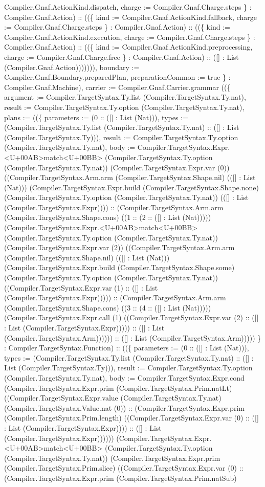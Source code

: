 \documentclass[11pt]{article}
\begin{document}
Compiler.Gnaf.ActionKind.dispatch, charge := Compiler.Gnaf.Charge.steps \} : Compiler.Gnaf.Action) :: ((\{ kind := Compiler.Gnaf.ActionKind.fallback, charge := Compiler.Gnaf.Charge.steps \} : Compiler.Gnaf.Action) :: ((\{ kind := Compiler.Gnaf.ActionKind.execution, charge := Compiler.Gnaf.Charge.steps \} : Compiler.Gnaf.Action) :: ((\{ kind := Compiler.Gnaf.ActionKind.preprocessing, charge := Compiler.Gnaf.Charge.free \} : Compiler.Gnaf.Action) :: ([] : List (Compiler.Gnaf.Action))))))), boundary := Compiler.Gnaf.Boundary.preparedPlan, preparationCommon := true \} : Compiler.Gnaf.Machine), carrier := Compiler.Gnaf.Carrier.grammar ((\{ argument := Compiler.TargetSyntax.Ty.list (Compiler.TargetSyntax.Ty.nat), result := Compiler.TargetSyntax.Ty.option (Compiler.TargetSyntax.Ty.nat), plans := ((\{ parameters := (0 :: ([] : List (Nat))), types := (Compiler.TargetSyntax.Ty.list (Compiler.TargetSyntax.Ty.nat) :: ([] : List (Compiler.TargetSyntax.Ty))), result := Compiler.TargetSyntax.Ty.option (Compiler.TargetSyntax.Ty.nat), body := Compiler.TargetSyntax.Expr.<U+00AB>match<U+00BB> (Compiler.TargetSyntax.Ty.option (Compiler.TargetSyntax.Ty.nat)) (Compiler.TargetSyntax.Expr.var (0)) ((Compiler.TargetSyntax.Arm.arm (Compiler.TargetSyntax.Shape.nil) (([] : List (Nat))) (Compiler.TargetSyntax.Expr.build (Compiler.TargetSyntax.Shape.none) (Compiler.TargetSyntax.Ty.option (Compiler.TargetSyntax.Ty.nat)) (([] : List (Compiler.TargetSyntax.Expr)))) :: (Compiler.TargetSyntax.Arm.arm (Compiler.TargetSyntax.Shape.cons) ((1 :: (2 :: ([] : List (Nat))))) (Compiler.TargetSyntax.Expr.<U+00AB>match<U+00BB> (Compiler.TargetSyntax.Ty.option (Compiler.TargetSyntax.Ty.nat)) (Compiler.TargetSyntax.Expr.var (2)) ((Compiler.TargetSyntax.Arm.arm (Compiler.TargetSyntax.Shape.nil) (([] : List (Nat))) (Compiler.TargetSyntax.Expr.build (Compiler.TargetSyntax.Shape.some) (Compiler.TargetSyntax.Ty.option (Compiler.TargetSyntax.Ty.nat)) ((Compiler.TargetSyntax.Expr.var (1) :: ([] : List (Compiler.TargetSyntax.Expr))))) :: (Compiler.TargetSyntax.Arm.arm (Compiler.TargetSyntax.Shape.cons) ((3 :: (4 :: ([] : List (Nat))))) (Compiler.TargetSyntax.Expr.call (1) ((Compiler.TargetSyntax.Expr.var (2) :: ([] : List (Compiler.TargetSyntax.Expr))))) :: ([] : List (Compiler.TargetSyntax.Arm)))))) :: ([] : List (Compiler.TargetSyntax.Arm))))) \} : Compiler.TargetSyntax.Function) :: ((\{ parameters := (0 :: ([] : List (Nat))), types := (Compiler.TargetSyntax.Ty.list (Compiler.TargetSyntax.Ty.nat) :: ([] : List (Compiler.TargetSyntax.Ty))), result := Compiler.TargetSyntax.Ty.option (Compiler.TargetSyntax.Ty.nat), body := Compiler.TargetSyntax.Expr.cond (Compiler.TargetSyntax.Expr.prim (Compiler.TargetSyntax.Prim.natLt) ((Compiler.TargetSyntax.Expr.value (Compiler.TargetSyntax.Ty.nat) (Compiler.TargetSyntax.Value.nat (0)) :: (Compiler.TargetSyntax.Expr.prim (Compiler.TargetSyntax.Prim.length) ((Compiler.TargetSyntax.Expr.var (0) :: ([] : List (Compiler.TargetSyntax.Expr)))) :: ([] : List (Compiler.TargetSyntax.Expr)))))) (Compiler.TargetSyntax.Expr.<U+00AB>match<U+00BB> (Compiler.TargetSyntax.Ty.option (Compiler.TargetSyntax.Ty.nat)) (Compiler.TargetSyntax.Expr.prim (Compiler.TargetSyntax.Prim.slice) ((Compiler.TargetSyntax.Expr.var (0) :: (Compiler.TargetSyntax.Expr.prim (Compiler.TargetSyntax.Prim.natSub) 
\end{document}
